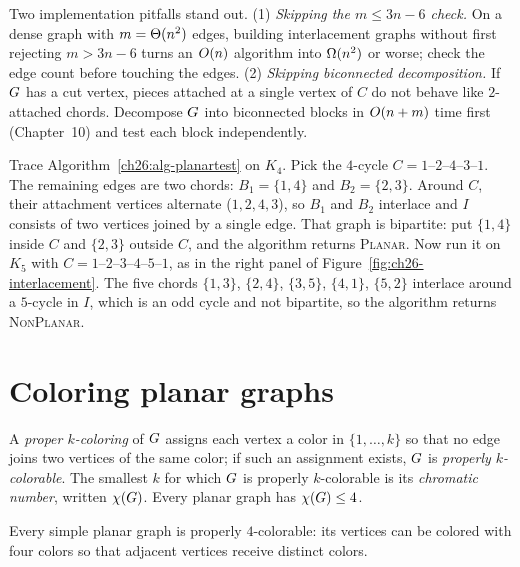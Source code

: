 \begin{trapbox}
Two implementation pitfalls stand out. (1) \emph{Skipping the $m \le 3n-6$ check.} On a
dense graph with $m = \Theta(n^2)$ edges, building interlacement graphs without first rejecting
$m > 3n-6$ turns an $O(n)$ algorithm into $\Omega(n^2)$ or worse; check the edge count
before touching the edges. (2) \emph{Skipping biconnected decomposition.} If $G$ has a
cut vertex, pieces attached at a single vertex of $C$ do not behave like $2$-attached
chords. Decompose $G$ into biconnected blocks in $O(n+m)$ time first (Chapter~10) and
test each block independently.
\end{trapbox}

\begin{labbox}
Trace Algorithm~\ref{ch26:alg-planartest} on $K_4$. Pick the $4$-cycle
$C = 1\text{--}2\text{--}4\text{--}3\text{--}1$. The remaining edges are two chords:
$B_1 = \{1,4\}$ and $B_2 = \{2,3\}$. Around $C$, their attachment vertices alternate
($1, 2, 4, 3$), so $B_1$ and $B_2$ interlace and $I$ consists of two vertices joined by a
single edge. That graph is bipartite: put $\{1,4\}$ inside $C$ and $\{2,3\}$ outside $C$,
and the algorithm returns \textsc{Planar}. Now run it on $K_5$ with
$C = 1\text{--}2\text{--}3\text{--}4\text{--}5\text{--}1$, as in the right panel of
Figure~\ref{fig:ch26-interlacement}. The five chords $\{1,3\}$, $\{2,4\}$, $\{3,5\}$,
$\{4,1\}$, $\{5,2\}$ interlace around a $5$-cycle in $I$, which is an odd cycle and not
bipartite, so the algorithm returns \textsc{NonPlanar}.
\end{labbox}

\section{Coloring planar graphs}
\label{ch26:coloring}

A \emph{proper $k$-coloring} of $G$ assigns each vertex a color in $\{1,\dots,k\}$ so
that no edge joins two vertices of the same color; if such an assignment exists, $G$ is
\emph{properly $k$-colorable}. The smallest $k$ for which $G$ is properly $k$-colorable
is its \emph{chromatic number}, written $\chi(G)$. Every planar graph has
$\chi(G) \le 4$.

\begin{theorem}
\label{ch26:thm-4ct}
Every simple planar graph is properly $4$-colorable: its vertices can be colored with four
colors so that adjacent vertices receive distinct colors.
\end{theorem}

